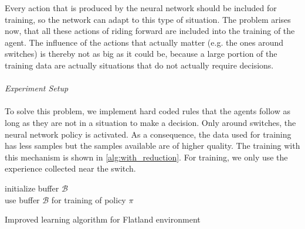 Every action that is produced by the neural network should be included for training, so the network can adapt to this type of situation. The problem arises now, that all these actions of riding forward are included into the training of the agent. The influence of the actions that actually matter (e.g. the ones around switches) is thereby not as big as it could be, because a large portion of the training data are actually situations that do not actually require decisions.\\\\
\textit{Experiment Setup}\\\\
To solve this problem, we implement hard coded rules that the agents follow as long as they are not in a situation to make a decision. Only around switches, the neural network policy is activated. As a consequence, the data used for training has less samples but the samples available are of higher quality. The training with this mechanism is shown in \autoref{alg:with_reduction}.
For training, we only use the experience collected near the switch.\\
\begin{algorithm}[H]
	initialize buffer $\mathcal{B}$\\
	use buffer $\mathcal{B}$ for training of policy $\pi$
	\caption{Improved learning algorithm for Flatland environment}
	\label{alg:with_reduction}
\end{algorithm}
